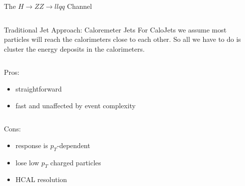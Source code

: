 \begin{frame}{The $H \rightarrow ZZ \rightarrow llqq$ Channel}
\begin{center}
\begin{columns}
\begin{column}{0.3\textwidth}
  \end{column}
\end{columns}

\end{center}
\end{frame}





\begin{frame}{Traditional Jet Approach: Caloremeter Jets}
For CaloJets we assume most particles will reach the calorimeters close to each other.  So all we have to do is cluster the energy deposits in the calorimeters.

\begin{columns}[T]
  \begin{column}{0.6\textwidth}
    \vspace{2em}
    \begin{column}{0.5\textwidth}
      Pros:
      \begin{itemize}
      \item
        straightforward
      \item
        fast and unaffected by event complexity
      \end{itemize}
    \end{column}
    \begin{column}{0.5\textwidth}
      Cons:
      \begin{itemize}
      \item
        response is $p_{T}$-dependent
      \item
        lose low $p_{T}$ charged particles
      \item
        HCAL resolution
      \end{itemize}
    \end{column}
  \end{column}
  \begin{column}{0.40\textwidth}

\end{column}
\end{columns}
\end{frame}
